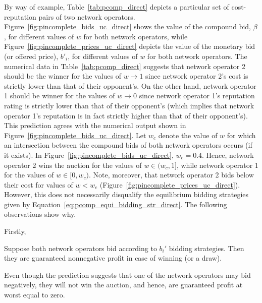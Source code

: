 By way of example, Table~\ref{tab:pcomp_direct} depicts a particular set of cost-reputation pairs of two network operators. Figure~\ref{fig:pincomplete_bids_uc_direct} shows the value of the compound bid, $\beta$, for different values of $w$ for both network operators, while Figure~\ref{fig:pincomplete_prices_uc_direct} depicts the value of the monetary bid (or offered price), $b'_i$, for different values of $w$ for both network operators. The numerical data in Table~\ref{tab:pcomp_direct} suggests that network operator 2 should be the winner for the values of $w\rightarrow 1$ since network operator 2's cost is strictly lower than that of their opponent's. On the other hand, network operator 1 should be winner for the values of $w\rightarrow 0$ since network operator 1's reputation rating is strictly lower than that of their opponent's (which implies that network operator 1's reputation is in fact strictly higher than that of their opponent's). This prediction agrees with the numerical output shown in Figure~\ref{fig:pincomplete_bids_uc_direct}. Let $w_c$ denote the value of $w$ for which an intersection between the compound bids of both network operators occurs (if it exists). In Figure~\ref{fig:pincomplete_bids_uc_direct}, $w_c=0.4$. Hence, network operator 2 wins the auction for the values of $w\in(w_c,1]$, while network operator 1 for the values of $w\in[0,w_c)$. Note, moreover, that network operator 2 bids below their cost for values of $w<w_c$ (Figure~\ref{fig:pincomplete_prices_uc_direct}). However, this does not necessarily disqualify the equilibrium bidding strategies given by Equation~\eqref{eq:pcomp_equi_bidding_str_direct}. The following observations show why.

Firstly,
\begin{proposition}
\label{prop:pcomp_negative_bids_direct}
Suppose both network operators bid according to $b_i'$ bidding strategies. Then they are guaranteed nonnegative profit in case of winning (or a draw).
\end{proposition}
\noindent Even though the prediction suggests that one of the network operators may bid negatively, they will not win the auction, and hence, are guaranteed profit at worst equal to zero.


